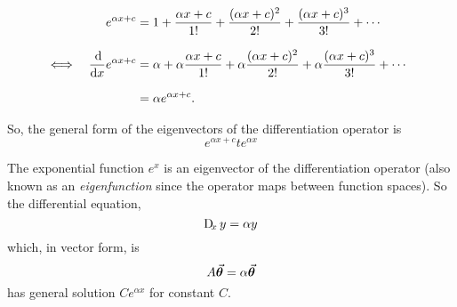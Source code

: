 \documentclass[MathsNotesBase.tex]{subfiles}
\begin{document}
{		\begin{align*}
		&& e^{\alpha x + c} &= 1 + \frac{\alpha x + c}{1!} + \frac{(\alpha x + c)^2}{2!} + \frac{(\alpha x + c)^3}{3!} + \cdots \\[8pt]
		&\iff & \frac{\dif}{\dif x} e^{\alpha x + c} &= \alpha + \alpha\frac{\alpha x + c}{1!} + \alpha\frac{(\alpha x + c)^2}{2!} + \alpha\frac{(\alpha x + c)^3}{3!} + \cdots &\sidecomment{} \\[8pt]
		&&&= \alpha e^{\alpha x + c}.
		\end{align*}
		
		So, the general form of the eigenvectors of the differentiation operator is
		\[ e^{\alpha x + c} te^{\alpha x} \]
		
		\bigskip\bigskip\bigskip
		The exponential function $e^x$ is an eigenvector of the differentiation operator (also known as an \textit{eigenfunction} since the operator maps between function spaces). So the differential equation,
		\begin{equation}
			\Dif_x y = \alpha y
		\end{equation}
		which, in vector form, is
		\begin{equation}
			A\vec{\bm{\theta}} = \alpha \vec{\bm{\theta}}
		\end{equation}
		has general solution $Ce^{\alpha x}$ for constant $C$.
	}



\end{document}

